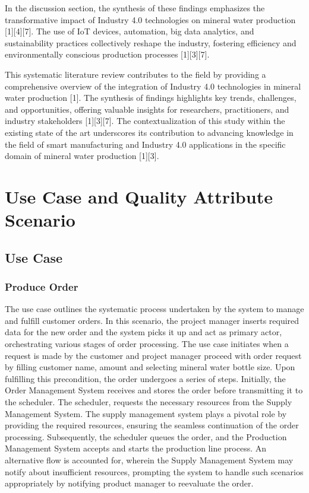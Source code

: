 \documentclass[conference]{IEEEtran}
\begin{document}
In the discussion section, the synthesis of these findings emphasizes the transformative impact of Industry 4.0 technologies on mineral water production [1][4][7]. The use of IoT devices, automation, big data analytics, and sustainability practices collectively reshape the industry, fostering efficiency and environmentally conscious production processes [1][3][7].

This systematic literature review contributes to the field by providing a comprehensive overview of the integration of Industry 4.0 technologies in mineral water production [1]. The synthesis of findings highlights key trends, challenges, and opportunities, offering valuable insights for researchers, practitioners, and industry stakeholders [1][3][7]. The contextualization of this study within the existing state of the art underscores its contribution to advancing knowledge in the field of smart manufacturing and Industry 4.0 applications in the specific domain of mineral water production [1][3].


\section{Use Case and Quality Attribute Scenario}
\label{sec:use_case_and_qas}

\subsection{Use Case}
\label{sec:use_case}
\subsubsection{\textbf{Produce Order}}
The use case outlines the systematic process undertaken by the system to manage and fulfill customer orders. In this scenario, the project manager inserts required data for the new order and the system picks it up and act as primary actor, orchestrating various stages of order processing. The use case initiates when a request is made by the customer and project manager proceed with order request by filling customer name, amount and selecting mineral water bottle size.  Upon fulfilling this precondition, the order undergoes a series of steps. Initially, the Order Management System receives and stores the order before transmitting it to the scheduler. The scheduler, requests the necessary resources from the Supply Management System. The supply management system plays a pivotal role by providing the required resources, ensuring the seamless continuation of the order processing. Subsequently, the scheduler queues the order, and the Production Management System accepts and starts the production line process. An alternative flow is accounted for, wherein the Supply Management System may notify about insufficient resources, prompting the system to handle such scenarios appropriately by notifying product manager to reevaluate the order.
\end{document}
